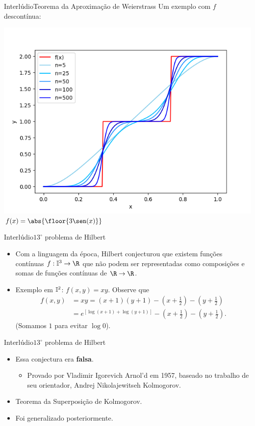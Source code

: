 \documentclass[13pt]{beamer}
\begin{document}
\begin{frame}{Interlúdio}{Teorema da Aproximação de Weierstrass}
    \vspace{3pt}
    Um exemplo com \( f \) descontínua:
    \begin{center}
        \includegraphics[width=.75\textwidth]{../figuras/weierstrass_cobrinha.png}
        \( f ( x ) = \abs{ \floor{3\sen ( x )} } \)
    \end{center}
\end{frame}

\begin{frame}{Interlúdio}{\( 13^{ \circ } \) problema de Hilbert}
    \begin{itemize}
        \item Com a linguagem da época, Hilbert conjecturou que existem funções contínuas \( f : \I^{ 3 } \to \R \) que não podem ser representadas como composições e somas de funções contínuas de \( \R \to \R \).
        \item Exemplo em \( \mathbb{I}^{ 2 } \): \( f ( x, y ) = xy \). Observe que
            \begin{align*}
                f ( x, y) &= xy = ( x+1 ) ( y+1 ) - \left(x + \frac{ 1 }{ 2 }\right) - \left(y + \frac{ 1 }{ 2 }\right) \\
                          &= e^{ [ \log ( x + 1 ) + \log ( y+1 ) ] } - \left(x + \frac{ 1 }{ 2 }\right) - \left(y + \frac{ 1 }{ 2 }\right)
            .\end{align*}
            (Somamos \( 1 \) para evitar \( \log 0 \)).
    \end{itemize}
\end{frame}

\begin{frame}{Interlúdio}{\( 13^{ \circ } \) problema de Hilbert}
    \begin{itemize}
        \item<1-> Essa conjectura era \textbf{falsa}.
            \begin{itemize}
                \item<2-> Provado por Vladimir Igorevich Arnol'd em 1957, baseado no trabalho de seu orientador, Andrej Nikolajewitseh Kolmogorov.
            \end{itemize}
        \item<3-> Teorema da Superposição de Kolmogorov.
        \item<4-> Foi generalizado posteriormente.
    \end{itemize}
\end{frame}
\end{document}
